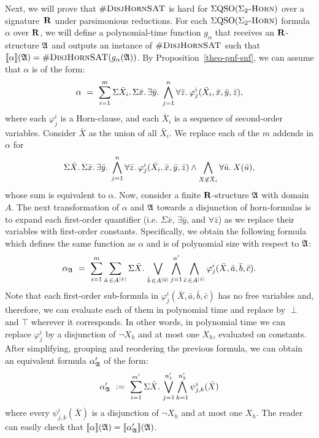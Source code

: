 Next, we will prove that $\textsc{\#DisjHornSAT}$ is hard for $\Sigma{\rm QSO}(\Sigma_2\textsc{-Horn})$ over a signature~$\mathbf{R}$ under parsimonious reductions. For each $\Sigma{\rm QSO}(\Sigma_2\textsc{-Horn})$ formula $\alpha$ over $\mathbf{R}$, we will define a polynomial-time function $g_{\alpha}$ that  receives an $\mathbf{R}$-structure $\mathfrak{A}$ and outputs an instance of $\textsc{\#DisjHornSAT}$ such that ${\llbracket{}{\alpha}\rrbracket}(\mathfrak{A}) = \textsc{\#DisjHornSAT}(g_{\alpha}(\mathfrak{A}))$. By Proposition~\ref{theo-pnf-snf}, we can assume that $\alpha$ is of the form:
$$
\alpha \ = \ \sum_{i = 1}^{m} \Sigma{\bar{X}_{i}}.\,\Sigma{\bar{x}}.\, \exists{\bar{y}}.\: \bigwedge_{j = 1}^{n} \forall{\bar{z}}.\: \varphi^i_j(\bar{X}_{i},\bar{x},\bar{y},\bar{z}),
$$
where each $\varphi^i_j$ is a Horn-clause, and each $\bar{X}_{i}$ is a sequence of second-order variables.
Consider $\bar{X}$ as the union of all $\bar{X}_{i}$. We replace each of the $m$ addends in $\alpha$ for
$$
\Sigma{\bar{X}}.\,\Sigma{\bar{x}}.\, \exists{\bar{y}}.\: \bigwedge_{j = 1}^{n} \forall{\bar{z}}.\: \varphi^i_j(\bar{X}_{i},\bar{x},\bar{y},\bar{z})\wedge\bigwedge_{X\not\in\bar{X}_{i}}\forall{\bar{u}}.\:X(\bar{u}),
$$
whose sum is equivalent to $\alpha$.
Now, consider a finite $\mathbf{R}$-structure $\mathfrak{A}$ with domain $A$. 
The next transformation of $\alpha$ and $\mathfrak{A}$ towards a disjunction of horn-formulas is to expand each first-order quantifier (i.e. $\Sigma{\bar{x}}$,  $\exists\bar{y}$, and $\forall\bar{z}$) as we replace their variables with first-order constants. Specifically, we obtain the following formula which defines the same function as $\alpha$ and is of polynomial size with respect to $\mathfrak{A}$:
$$
\alpha_{\mathfrak{A}} \ = \ \sum_{i = 1}^{m} \sum_{\bar{a}\,\in A^{\vert \bar{x} \vert}} \Sigma{\bar{X}}.\,\bigvee_{\bar{b}\,\in A^{\vert \bar{y} \vert}}\bigwedge_{j = 1}^{n'}\bigwedge_{\bar{c}\,\in A^{\vert \bar{z} \vert}}\varphi^i_j(\bar{X},\bar{a},\bar{b},\bar{c}).
$$
Note that each first-order sub-formula in $\varphi^i_j(\bar{X},\bar{a},\bar{b},\bar{c})$ has no free variables and, therefore, we can evaluate each of them in polynomial time and replace by $\perp$ and $\top$ wherever it corresponds. In other words, in polynomial time we can replace $\varphi^i_j$ by a disjunction of $\neg X_{h}$ and at most one $X_{h}$, evaluated on constants.
After simplifying, grouping and reordering the previous formula, we can obtain an equivalent formula $\alpha_{\mathfrak{A}}'$ of the form:
$$
\alpha_{\mathfrak{A}}' \ := \ \sum_{i = 1}^{m'}\Sigma{\bar{X}}.\,\bigvee_{j = 1}^{n_1'}\bigwedge_{k = 1}^{n_2'}\psi^{i}_{j,k}(\bar{X})
$$
where every $\psi^{i}_{j,k}(\bar{X})$ is a disjunction of $\neg X_{h}$ and at most one $X_{h}$.
The reader can easily check that ${\llbracket{}{\alpha}\rrbracket}(\mathfrak{A}) = {\llbracket{}{\alpha_{\mathfrak{A}}'}\rrbracket}(\mathfrak{A})$. 

